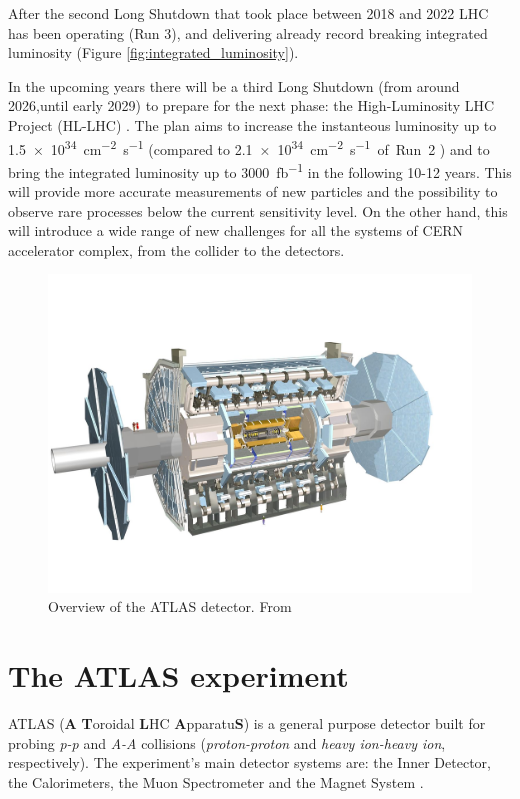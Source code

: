 After the second Long Shutdown that took place between 2018 and 2022 LHC has been operating (Run 3), and delivering already record breaking integrated luminosity (Figure \ref{fig:integrated_luminosity}).

In the upcoming years there will be a third Long Shutdown (from around 2026,until early 2029) to prepare for the next phase: the High-Luminosity LHC Project (HL-LHC) \cite{cernHLLHCProject}. The plan aims to increase the instanteous luminosity up to \qty{1.5e34}{\centi\meter^{-2}\second^{-1}} (compared to \qty{2.1e34}{\centi\meter^{-2}\second^{-1} of Run 2} \cite{CERN-LHCC-2020-007}) and to bring the integrated luminosity up to \qty{3000}{\femto\barn^{-1}} in the following 10-12 years. This will provide more accurate measurements of new particles and the possibility to observe rare processes below the current sensitivity level. On the other hand, this will introduce a wide range of new challenges for all the systems of CERN accelerator complex, from the collider to the detectors.

\begin{figure}[!ht]
    \centering
    \includegraphics[width=.7\textwidth]{Images/intro/ATLAS_detector.jpg}
    \captionsetup{width=.8\linewidth}
    \caption{Overview of the ATLAS detector. From \cite{atlasDetectorTechnology}}
    \label{fig:ATLAS}
\end{figure}


\section{The ATLAS experiment}\label{sec:ATLAS}

ATLAS (\textbf{A} \textbf{T}oroidal \textbf{L}HC \textbf{A}pparatu\textbf{S}) is a general purpose detector built for probing \textit{p-p} and \textit{A-A} collisions (\textit{proton-proton} and \textit{heavy ion-heavy ion}, respectively). The experiment's main detector systems are: the Inner Detector, the Calorimeters, the Muon Spectrometer and the Magnet System \cite{Collaboration_The_ATLAS2008}.

